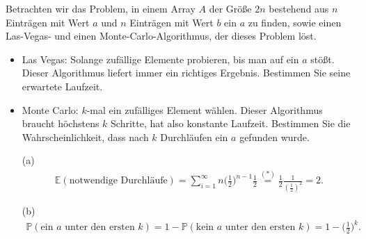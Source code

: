 
\begin{exercise}

\phantom{}

\end{exercise}

Betrachten wir das Problem, in einem Array $A$ der Größe $2n$ bestehend aus $n$ Einträgen mit Wert $a$ und $n$ Einträgen mit Wert $b$ ein $a$ zu finden, sowie einen Las-Vegas- und einen Monte-Carlo-Algorithmus, der dieses Problem löst.

\begin{itemize}
  \item Las Vegas: Solange zufällige Elemente probieren, bis man auf ein $a$ stößt.
  Dieser Algorithmus liefert immer ein richtiges Ergebnis. Bestimmen Sie seine erwartete Laufzeit.
  \item Monte Carlo: $k$-mal ein zufälliges Element wählen. Dieser Algorithmus braucht höchstens $k$ Schritte, hat also konstante Laufzeit. Bestimmen Sie die Wahrscheinlichkeit, dass nach $k$ Durchläufen ein $a$ gefunden wurde.
\end{itemize}

\begin{solution}

\phantom{}\begin{itemize}
    \item[(a)]
    \begin{align*}
        \mathbb E(\text{notwendige Durchläufe}) = \sum_{i = 1}^\infty n \biggr(\frac{1}{2}\biggl)^{n-1} \frac{1}{2} \stackrel{(\ast)}{=} \frac{1}{2} \frac{1}{(\frac{1}{2})^2} = 2.
    \end{align*}
    \item[(b)]
    \begin{align*}
        \mathbb P(\text{ein $a$ unter den ersten $k$}) = 1 - \mathbb P(\text{kein $a$ unter den ersten $k$}) = 1 - \biggl(\frac{1}{2}\biggr)^k.
    \end{align*}
\end{itemize}

\end{solution}
